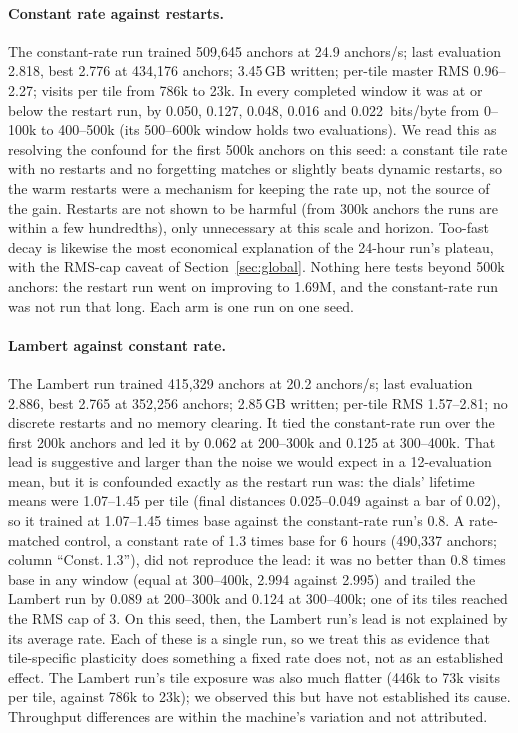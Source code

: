 \documentclass[10pt]{article}
\newcommand{\bpb}{bits/byte}
\begin{document}
\paragraph{Constant rate against restarts.} The constant-rate run trained 509,645 anchors at 24.9
anchors/s; last evaluation 2.818, best 2.776 at 434,176 anchors; 3.45\,GB written; per-tile master
RMS 0.96--2.27; visits per tile from 786k to 23k. In every completed window it was at or below the
restart run, by 0.050, 0.127, 0.048, 0.016 and 0.022~\bpb{} from 0--100k to 400--500k (its 500--600k
window holds two evaluations). We read this as resolving the confound for the first 500k anchors on
this seed: a constant tile rate with no restarts and no forgetting matches or slightly beats dynamic
restarts, so the warm restarts were a mechanism for keeping the rate up, not the source of the gain.
Restarts are not shown to be harmful (from 300k anchors the runs are within a few hundredths), only
unnecessary at this scale and horizon. Too-fast decay is likewise the most economical explanation of
the 24-hour run's plateau, with the RMS-cap caveat of Section~\ref{sec:global}. Nothing here tests
beyond 500k anchors: the restart run went on improving to 1.69M, and the constant-rate run was not run
that long. Each arm is one run on one seed.

\paragraph{Lambert against constant rate.} The Lambert run trained 415,329 anchors at 20.2 anchors/s;
last evaluation 2.886, best 2.765 at 352,256 anchors; 2.85\,GB written; per-tile RMS 1.57--2.81; no
discrete restarts and no memory clearing. It tied the constant-rate run over the first 200k anchors
and led it by 0.062 at 200--300k and 0.125 at 300--400k. That lead is suggestive and larger than the
noise we would expect in a 12-evaluation mean, but it is confounded exactly as the restart run was:
the dials' lifetime means were 1.07--1.45 per tile (final distances 0.025--0.049 against a bar of
0.02), so it trained at 1.07--1.45 times base against the constant-rate run's 0.8. A rate-matched control,
a constant rate of 1.3 times base for 6 hours (490,337 anchors; column ``Const.\,1.3''), did not
reproduce the lead: it was no better than 0.8 times base in any window (equal at 300--400k, 2.994
against 2.995) and trailed the Lambert run by 0.089 at 200--300k and 0.124 at 300--400k; one of its
tiles reached the RMS cap of 3. On this seed, then, the Lambert run's lead is not explained by its
average rate. Each of these is a single run, so we treat this as evidence that tile-specific
plasticity does something a fixed rate does not, not as an established effect. The Lambert run's tile exposure was
also much flatter (446k to 73k visits per tile, against 786k to 23k); we observed this but have not
established its cause. Throughput differences are within the machine's variation and not attributed.
\end{document}

